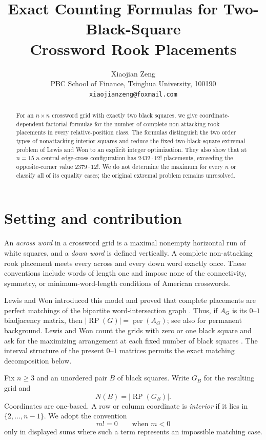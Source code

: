 \documentclass[11pt]{article}
\title{Exact Counting Formulas for Two-Black-Square\\
Crossword Rook Placements}
\author{Xiaojian Zeng\\
PBC School of Finance, Tsinghua University, 100190\\
\texttt{xiaojianzeng@foxmail.com}}
\date{}
\newcommand{\RP}{\operatorname{RP}}
\newcommand{\permanent}{\operatorname{per}}
\begin{document}
\maketitle

\begin{abstract}
For an $n\times n$ crossword grid with exactly two black squares, we give
coordinate-dependent factorial formulas for the number of complete
non-attacking rook placements in every relative-position class.  The formulas
distinguish the two order types of nonattacking interior squares and reduce the
fixed-two-black-square extremal problem of Lewis and Won to an explicit integer
optimization.  They also show that at $n=15$ a central edge-cross configuration
has $2432\cdot12!$ placements, exceeding the opposite-corner value
$2379\cdot12!$.  We do not determine the maximum for every $n$ or classify all
of its equality cases; the original extremal problem remains unresolved.
\end{abstract}

\section{Setting and contribution}

An \emph{across word} in a crossword grid is a maximal nonempty horizontal run
of white squares, and a \emph{down word} is defined vertically.  A complete
non-attacking rook placement meets every across and every down word exactly
once.  These conventions include words of length one and impose none of the
connectivity, symmetry, or minimum-word-length conditions of American
crosswords.

Lewis and Won introduced this model and proved that complete placements are
perfect matchings of the bipartite word-intersection graph
\cite[Section~2]{2609.03081}.  Thus, if $A_G$ is its $0$--$1$ biadjacency
matrix, then $|\RP(G)|=\permanent(A_G)$; see also
\cite[Chapter~7]{BrualdiRyser1991} for permanent background.  Lewis and Won
count the grids with zero or one black square and ask for the maximizing
arrangement at each fixed number of black squares
\cite[Question~2.2]{2609.03081}.  The interval structure of the present
$0$--$1$ matrices permits the exact matching decomposition below.

Fix $n\geq3$ and an unordered pair $B$ of black squares.  Write $G_B$ for the
resulting grid and
\[
   N(B)=|\RP(G_B)|.
\]
Coordinates are one-based.  A row or column coordinate is \emph{interior} if
it lies in $\{2,\ldots,n-1\}$.  We adopt the convention
\[
       m! =0 \qquad\text{when }m<0                                      \tag{1}
\]
only in displayed sums where such a term represents an impossible matching
case.
\end{document}
